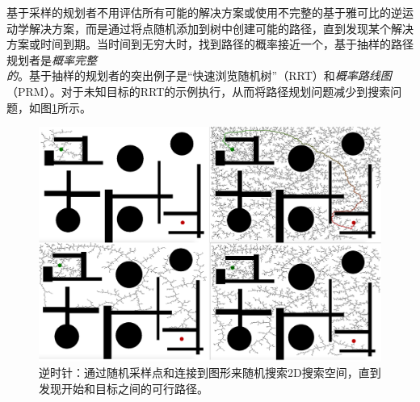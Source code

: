 基于采样的规划者不用评估所有可能的解决方案或使用不完整的基于雅可比的逆运动学解决方案，而是通过将点随机添加到树中创建可能的路径，直到发现某个解决方案或时间到期。当时间到无穷大时，找到路径的概率接近一个，基于抽样的路径规划者是\emph{概率完整的}。基于抽样的规划者的突出例子是“快速浏览随机树”（RRT）\cite{lavalle1998rapidly}和\emph{概率路线图}（PRM）\cite{kavraki1996probabilistic}。对于未知目标的RRT的示例执行，从而将路径规划问题减少到搜索问题，如图\ref{fig:rrt}所示。


\begin{figure}
\centering
\includegraphics[width=\textwidth]{figs/irrt}
\caption{逆时针：通过随机采样点和连接到图形来随机搜索2D搜索空间，直到发现开始和目标之间的可行路径。\label{fig:rrt}}
\end{figure}


